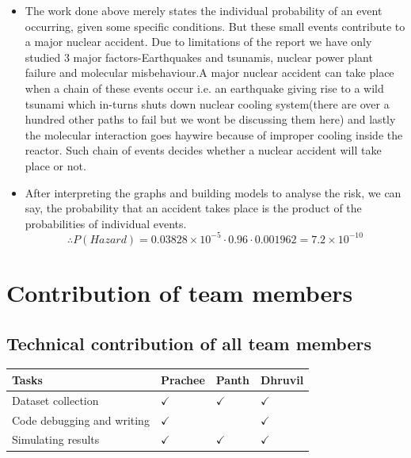 \documentclass{article}
\begin{document}
\begin{itemize}

\item The work done above merely states the individual probability of an event occurring, given some specific conditions. But these small events contribute to a major nuclear accident. Due to limitations of the report we have only studied 3 major factors-Earthquakes and tsunamis, nuclear power plant failure and molecular misbehaviour.A major nuclear accident can take place when a chain of these events occur i.e. an earthquake giving rise to a wild tsunami which in-turns shuts down nuclear cooling system(there are over a hundred other paths to fail but we wont be discussing them here) and lastly the molecular interaction goes haywire because of improper cooling inside the reactor. Such chain of events decides whether a nuclear accident will take place or not.

\item After interpreting the graphs and building models to analyse the risk, we can say, the probability that an accident takes place is the product of the probabilities of individual events.
  \[\therefore P(Hazard)=0.03828 \times 10^{-5}\cdot 0.96 \cdot 0.001962 = 7.2 \times 10^{-10}\]
\end{itemize}

\section{Contribution of team members}
\subsection{Technical contribution of all team members }
\begin{table}[h]
  \centering
  \begin{tabular}{|l|l|l|l|}
    \hline
    Tasks              & Prachee       & Panth         & Dhruvil \\ \hline
    Dataset collection &       $\checkmark$          &    $\checkmark$            &     $\checkmark$     \\ \hline
    Code debugging and writing     &      $\checkmark$          &               &    $\checkmark$      \\ \hline
    Simulating results &   $\checkmark$            &      $\checkmark$          &       $\checkmark$   \\ \hline
  \end{tabular}
\end{table}
\end{document}

